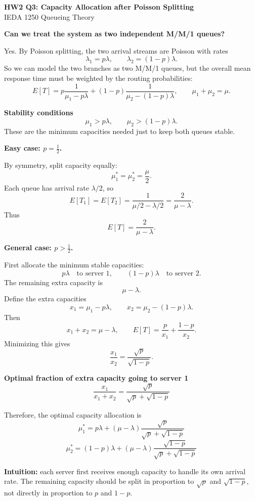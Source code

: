\documentclass[11pt]{article}
\begin{document}
\begin{center}
{\Large \bfseries HW2 Q3: Capacity Allocation after Poisson Splitting}\\[0.2cm]
{\normalsize IEDA 1250 Queueing Theory}
\end{center}

\vspace{0.1cm}

\textbf{Can we treat the system as two independent M/M/1 queues?}

Yes. By Poisson splitting, the two arrival streams are Poisson with rates
\[
\lambda_1=p\lambda,\qquad \lambda_2=(1-p)\lambda.
\]
So we can model the two branches as two M/M/1 queues, but the overall mean response
time must be weighted by the routing probabilities:
\[
E[T]
=
p\frac{1}{\mu_1-p\lambda}
+
(1-p)\frac{1}{\mu_2-(1-p)\lambda},
\qquad
\mu_1+\mu_2=\mu.
\]

\begin{keybox}
\textbf{Stability conditions}
\[
\mu_1>p\lambda,\qquad
\mu_2>(1-p)\lambda.
\]
These are the minimum capacities needed just to keep both queues stable.
\end{keybox}

\textbf{Easy case: \(p=\frac{1}{2}\).}

By symmetry, split capacity equally:
\[
\boxed{\mu_1^*=\mu_2^*=\frac{\mu}{2}.}
\]
Each queue has arrival rate \(\lambda/2\), so
\[
E[T_1]=E[T_2]
=\frac{1}{\mu/2-\lambda/2}
=\frac{2}{\mu-\lambda}.
\]
Thus
\[
\boxed{E[T]=\frac{2}{\mu-\lambda}.}
\]

\textbf{General case: \(p>\frac{1}{2}\).}

First allocate the minimum stable capacities:
\[
p\lambda \quad \text{to server 1},\qquad
(1-p)\lambda \quad \text{to server 2}.
\]
The remaining extra capacity is
\[
\mu-\lambda.
\]
Define the extra capacities
\[
x_1=\mu_1-p\lambda,\qquad
x_2=\mu_2-(1-p)\lambda.
\]
Then
\[
x_1+x_2=\mu-\lambda,
\qquad
E[T]=\frac{p}{x_1}+\frac{1-p}{x_2}.
\]
Minimizing this gives
\[
\frac{x_1}{x_2}
=
\frac{\sqrt{p}}{\sqrt{1-p}}.
\]

\begin{keybox}
\textbf{Optimal fraction of extra capacity going to server 1}
\[
\boxed{
\frac{x_1}{x_1+x_2}
=
\frac{\sqrt{p}}{\sqrt{p}+\sqrt{1-p}}
}
\]
\end{keybox}

Therefore, the optimal capacity allocation is
\[
\boxed{
\mu_1^*
=
p\lambda
+
(\mu-\lambda)
\frac{\sqrt{p}}{\sqrt{p}+\sqrt{1-p}}
}
\]
\[
\boxed{
\mu_2^*
=
(1-p)\lambda
+
(\mu-\lambda)
\frac{\sqrt{1-p}}{\sqrt{p}+\sqrt{1-p}}
}
\]

\vspace{0.1cm}
\textbf{Intuition:} each server first receives enough capacity to handle its own arrival
rate. The remaining capacity should be split in proportion to
\(\sqrt{p}\) and \(\sqrt{1-p}\), not directly in proportion to \(p\) and \(1-p\).
\end{document}
